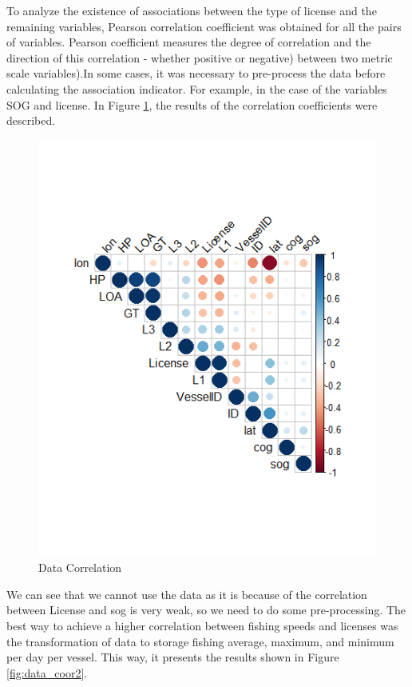 To analyze the existence of associations between the type of license and the remaining variables, Pearson correlation coefficient was obtained for all the pairs of variables. Pearson coefficient \cite{Benesty2009} measures the degree of correlation and the direction of this correlation - whether positive or negative) between two metric scale variables).In some cases, it was necessary to pre-process the data before calculating the association indicator. For example, in the case of the variables SOG and license. In Figure \ref{fig:data_coor1}, the results of the correlation coefficients were described.
\begin{figure}[h]
\centering
\includegraphics[width=0.7\linewidth]{Chapters/img/data_coor1.png}
\caption{Data Correlation}
\label{fig:data_coor1}
\end{figure}



We can see that we cannot use the data as it is because of the
correlation between License and sog is very weak, so we need to do some pre-processing.
The best way to achieve a higher correlation between fishing speeds and licenses was the transformation of data to storage fishing average, maximum, and minimum per day per vessel. This way, it presents the results shown in Figure \ref{fig:data_coor2}.

